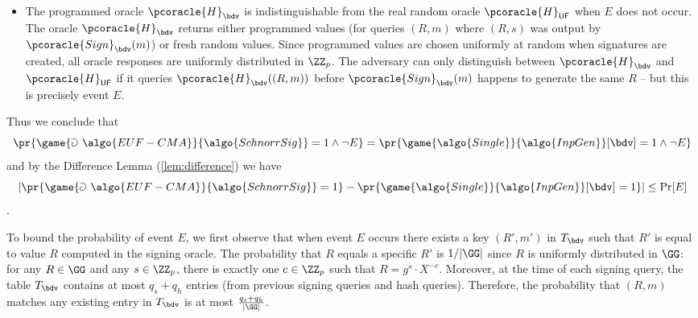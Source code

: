\begin{mysolution}
\begin{itemize}
    Both methods produce signatures satisfying the verification equation $g^s = R \cdot X^c$. The key insight is that:
    \begin{itemize}
      \item In the EUF-CMA game: Starting from uniform $r$, we get uniform $R \in \GG$ and compute $s$ deterministically
      \item In $\bdv$: Starting from uniform $(c, s)$, we compute $R$ deterministically to satisfy the same equation
    \end{itemize}

    Since there's a bijection between the randomness and valid signatures in both cases, and the oracle programming ensures $c = \pcoracle{H}_{\bdv}(R, m)$ when
  queried, both games produce identical signature distributions when $E$ does not occur.
  \item The programmed oracle $\pcoracle{H}_{\bdv}$ is indistinguishable from the real random oracle $\pcoracle{H}_{\mathsf{UF}}$ when $E$ does not occur. The oracle
  $\pcoracle{H}_{\bdv}$ returns either programmed values (for queries $(R, m)$ where $(R, s)$ was output by $\pcoracle{Sign}_{\bdv}(m)$) or fresh random
  values. Since programmed values are chosen uniformly at random when signatures are created, all oracle responses are uniformly
  distributed in $\ZZ_p$. The adversary can only distinguish between $\pcoracle{H}_{\bdv}$ and $\pcoracle{H}_{\mathsf{UF}}$ if it queries $\pcoracle{H}_{\bdv}((R, m))$
  before $\pcoracle{Sign}_{\bdv}(m)$ happens to generate the same $R$ – but this is precisely event $E$.
  \end{itemize}

  Thus we conclude that
  \[
    \pr{\game{\Game~\algo{EUF-CMA}}{\algo{SchnorrSig}} = 1 \wedge \neg E} =  \pr{\game{\algo{Single}}{\algo{InpGen}}[\bdv] = 1 \wedge \neg E}
  \] and by the Difference Lemma (\autoref{lem:difference}) we have
  \[
    |\pr{\game{\Game~\algo{EUF-CMA}}{\algo{SchnorrSig}} = 1} - \pr{\game{\algo{Single}}{\algo{InpGen}}[\bdv] = 1}| \leq \Pr[E]
  \].

  To bound the probability of event $E$, we first observe that when event $E$ occurs there exists a key $(R', m')$ in $T_{\bdv}$ such that $R'$ is equal to value $R$ computed in the signing oracle.
  The probability that $R$ equals a specific $R'$ is $1/|\GG|$ since $R$ is uniformly distributed in $\GG$: for any $R \in \GG$ and any $s \in \ZZ_p$, there is exactly one $c \in \ZZ_p$ such that $R = g^s \cdot X^{-c}$.
  Moreover, at the time of each signing query, the table $T_{\bdv}$ contains at most $q_s + q_h$ entries (from previous signing queries and hash queries).
  Therefore, the probability that $(R, m)$ matches any existing entry in $T_{\bdv}$ is at most $\frac{q_s + q_h}{|\GG|}$.


\end{mysolution}
